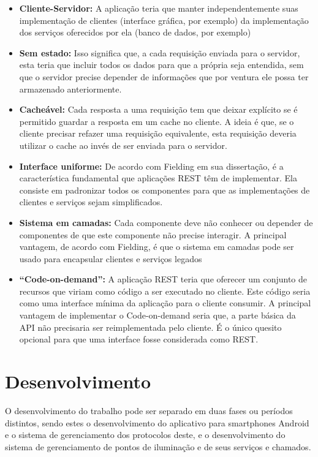 \documentclass[
	article,			%
	11pt,				%
	oneside,			%
	a4paper,			%
	english,			%
	brazil,				%
	sumario=tradicional
	]{abntex2}
\begin{document}
\begin{itemize}
\item \textbf{Cliente-Servidor:} A aplicação teria que manter independentemente suas
implementação de clientes (interface gráfica, por exemplo) da implementação dos
serviços oferecidos por ela (banco de dados, por exemplo)

\item \textbf{Sem estado:} Isso significa que, a cada requisição enviada para o servidor,
esta teria que incluir todos os dados para que a própria seja entendida,
sem que o servidor precise depender de informações que por ventura ele possa
ter armazenado anteriormente.

\item \textbf{Cacheável:} Cada resposta a uma requisição tem que deixar explícito se é
permitido guardar a resposta em um cache no cliente. A ideia é que, se o
cliente precisar refazer uma requisição equivalente, esta requisição deveria
utilizar o cache ao invés de ser enviada para o servidor.

\item \textbf{Interface uniforme:} De acordo com Fielding em sua dissertação, é a
característica fundamental que aplicações REST têm de implementar. Ela
consiste em padronizar todos os componentes para que as implementações de
clientes e serviços sejam simplificados.

\item \textbf{Sistema em camadas:} Cada componente deve não conhecer ou depender de
componentes de que este componente não precise interagir. A principal vantagem,
de acordo com Fielding, é que o sistema em camadas pode ser usado para
encapsular clientes e serviços legados

\item \textbf{“Code-on-demand”:} A aplicação REST teria que oferecer um conjunto de recursos
que viriam como código a ser executado no cliente. Este código seria como uma
interface mínima da aplicação para o cliente consumir. A principal vantagem de
implementar o Code-on-demand seria que, a parte básica da API não precisaria
ser reimplementada pelo cliente. É o único quesito opcional para que uma
interface fosse considerada como REST.
\end{itemize}

\section{Desenvolvimento}

O desenvolvimento do trabalho pode ser separado em duas fases ou períodos
distintos, sendo estes o desenvolvimento do aplicativo para smartphones Android
e o sistema de gerenciamento dos protocolos deste, e o desenvolvimento do
sistema de gerenciamento de pontos de iluminação e de seus serviços e chamados.
\end{document}

